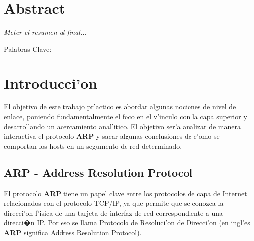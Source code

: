 \documentclass[a4paper,10pt]{article}
\begin{document}

\begin{titlepage}
\maketitle
\thispagestyle{empty}
\end{titlepage} 

\pagebreak
\tableofcontents

\pagebreak
\listoffigures

\pagebreak
\thispagestyle{fancy}

\section*{\centering Abstract}
{\em
Meter el resumen al final...
}
\vspace*{5 mm}

Palabras Clave: 


\section{Introducci'on}
\label{intro1:}

El objetivo de este trabajo pr'actico es abordar algunas nociones de nivel de enlace, poniendo fundamentalmente el foco en el v'inculo con la capa superior y desarrollando un acercamiento anal'itico. El objetivo ser'a analizar de manera interactiva el protocolo \textbf{ARP} y sacar algunas conclusiones de c'omo se comportan los hosts en un segumento de red determinado.

\subsection{ARP - Address Resolution Protocol}

El protocolo \textbf{ARP} tiene un papel clave entre los protocolos de capa de Internet relacionados con el protocolo TCP/IP, ya que permite que se conozca la direcci'on f'isica de una tarjeta de interfaz de red correspondiente a una direcci�n IP. Por eso se llama Protocolo de Resoluci'on de Direcci'on (en ingl'es \textbf{ARP} significa Address Resolution Protocol).
\end{document}
